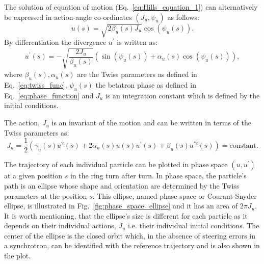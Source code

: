 The solution of equation of motion (Eq.~\eqref{eq:Hills_equation_1}) can alternatively be expressed in action-angle co-ordinates $(J_u, \psi_u)$ as follows:
\begin{equation}\label{eq:position_action_anlge}
    u(s) = \sqrt{2 \beta_u(s) J_u} \cos{(\psi_u(s))}.
\end{equation} 
By differentiation the divergence $u^\prime$ is written as:
\begin{equation}\label{eq:divergence_action_anlge}
    u^\prime(s) = - \sqrt{\frac{2 J_u}{\beta_u(s)}} (\sin{(\psi_u(s))}+\alpha_u(s)\cos{(\psi_u(s))}),
\end{equation} 
where $\beta_u(s), \alpha_u(s)$ are the Twiss parameters as defined in Eq.~\eqref{eq:twiss_func}, $\psi_u(s)$ the betatron phase as defined in Eq.~\eqref{eq:phase_function} and $J_u$ is an integration constant which is defined by the initial conditions. %

The action, $J_u$ is an invariant of the motion and can be written in terms of the Twiss parameters as: %
\begin{equation}\label{eq:action_definition}
    J_u = \frac{1}{2} (\gamma_u(s) u^2(s) + 2 \alpha_u(s) u(s) u^\prime(s) + \beta_u(s) u^{\prime 2}(s)) = \mathrm{constant}.
\end{equation}

The trajectory of each individual particle can be plotted in phase space $(u, u^\prime)$ at a given position $s$ in the ring turn after turn. In phase space, the particle's path is an ellipse whose shape and orientation are determined by the Twiss parameters at the position $s$. This ellipse, named phase space or Courant-Snyder ellipse, is illustrated in Fig.~\ref{fig:phase_space_ellipse} and it has an area of $2\pi J_u$. It is worth mentioning, that the ellipse's size is different for each particle as it depends on their individual actions, $J_u$ i.e. their individual initial conditions. The center of the ellipse is the closed orbit which, in the absence of steering errors in a synchrotron, can be identified with the reference trajectory and is also shown in the plot.

